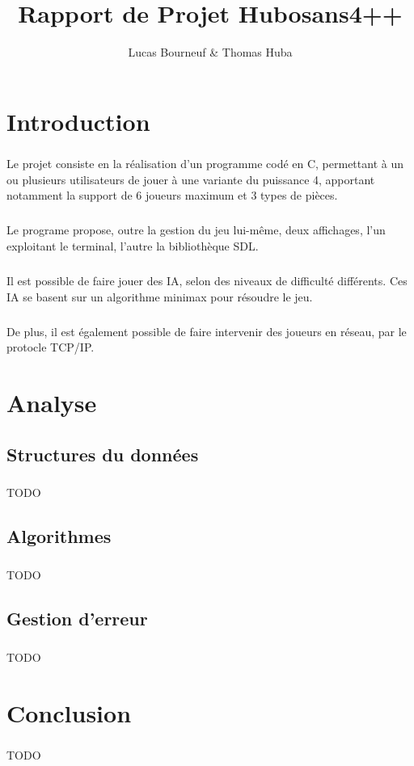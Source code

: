 \documentclass{report}
\title{Rapport de Projet Hubosans4++}
\author{Lucas Bourneuf \& Thomas Huba}
\begin{document}
\maketitle


\chapter*{Introduction}
\paragraph*{}
Le projet consiste en la réalisation d'un programme codé en C, permettant à un ou plusieurs utilisateurs de jouer à une variante du puissance 4,
apportant notamment la support de 6 joueurs maximum et 3 types de pièces.
\paragraph*{}
Le programe propose, outre la gestion du jeu lui-même, deux affichages, l'un exploitant le terminal, l'autre la bibliothèque SDL.
\paragraph*{}
Il est possible de faire jouer des IA, selon des niveaux de difficulté différents. Ces IA se basent sur un algorithme minimax pour résoudre le jeu.
\paragraph*{}
De plus, il est également possible de faire intervenir des joueurs en réseau, par le protocle TCP/IP.


\chapter*{Analyse}

\section*{Structures du données}
\paragraph*{}
TODO

\section*{Algorithmes}
\paragraph*{}
TODO

\section*{Gestion d'erreur}
\paragraph*{}
TODO


\chapter*{Conclusion}
\paragraph*{}
TODO
\end{document}

